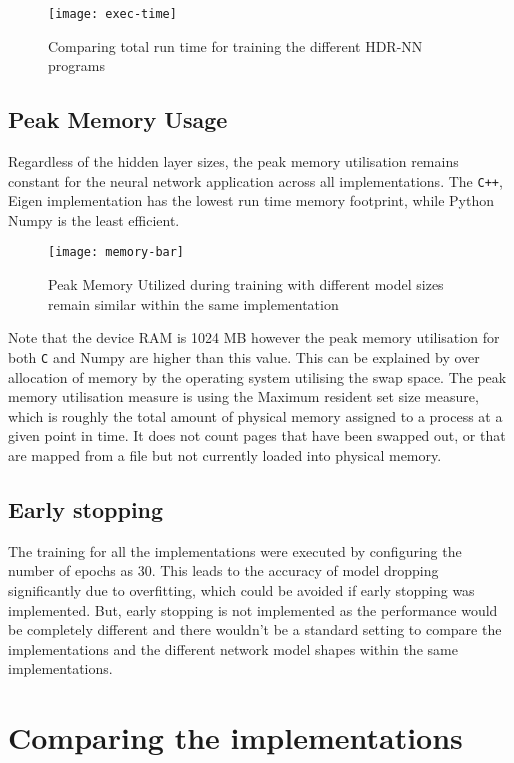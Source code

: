 \begin{figure}[!ht]
	\centering
	\texttt{[image: exec-time]}
	\caption[Execution Time vs Model Parameters]{Comparing total run time for training the different HDR-NN programs}
	\label{hdrnn-exectime}
\end{figure}

\subsection{Peak Memory Usage}
Regardless of the hidden layer sizes, the peak memory utilisation remains constant for the neural network application across all implementations. The \texttt{C++}, Eigen implementation has the lowest run time memory footprint, while Python Numpy is the least efficient.

\begin{figure}[!ht]
	\centering
	\texttt{[image: memory-bar]}
	\caption[Peak Memory Utilisation]{Peak Memory Utilized during training with different model sizes remain similar within the same implementation}
\end{figure}

Note that the device RAM is 1024 MB however the peak memory utilisation for both \texttt{C} and Numpy are higher than this value. This can be explained by over allocation of memory by the operating system utilising the swap space. The peak memory utilisation measure is using the Maximum resident set size measure, which is roughly the total amount of physical memory assigned to a process at a given point in time. It does not count pages that have been swapped out, or that are mapped from a file but not currently loaded into physical memory.

\subsection{Early stopping}

The training for all the implementations were executed by configuring the number of epochs as 30. This leads to the accuracy of model dropping significantly due to overfitting, which could be avoided if early stopping was implemented. But, early stopping is not implemented as the performance would be completely different and there wouldn't be a standard setting to compare the implementations and the different network model shapes within the same implementations.

\section{Comparing the implementations}

